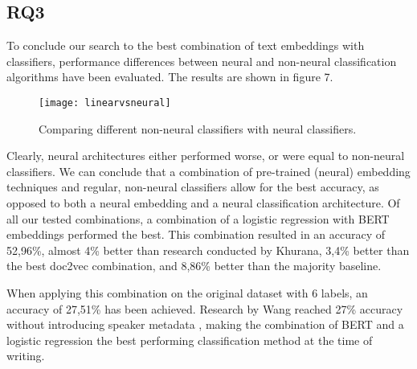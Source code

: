 \subsection{RQ3}
To conclude our search to the best combination of text embeddings with classifiers, performance differences between neural and non-neural classification algorithms have been evaluated.
The results are shown in figure 7. 

\begin{figure}[h]
    \centering
    \texttt{[image: linearvsneural]}
    \caption{Comparing different non-neural classifiers with neural classifiers.}
\end{figure}

Clearly, neural architectures either performed worse, or were equal to non-neural classifiers. 
We can conclude that a combination of pre-trained (neural) embedding techniques and regular, non-neural classifiers allow for the best accuracy, as opposed to both a neural embedding and a neural classification architecture.
Of all our tested combinations, a combination of a logistic regression with BERT embeddings performed the best. 
This combination resulted in an accuracy of 52,96\%, almost 4\% better than research conducted by Khurana, 3,4\% better than the best doc2vec combination, and 8,86\% better than the majority baseline.

When applying this combination on the original dataset with 6 labels, an accuracy of 27,51\% has been achieved. 
Research by Wang reached 27\% accuracy without introducing speaker metadata \cite{wang2018}, making the combination of BERT and a logistic regression the best performing classification method at the time of writing.